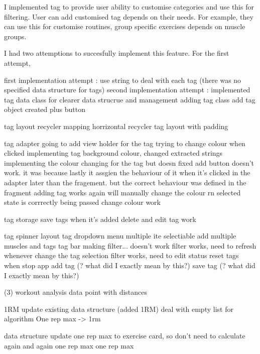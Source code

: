 
I implemented tag to provide user ability to customise categories and use this for filtering.
User can add customised tag depends on their needs.
For example, they can use this for customise routines, group specific exercises depends on muscle groups. 

I had two attemptions to succesfully implement this feature.
For the first attempt, 

first implementation attempt : use string to deal with each tag (there was no specified data structure for tags)
second implementation attempt : implemented tag data class for clearer data strucrue and management 
    adding tag class
    add tag object created
    plus button

\view
tag layout
recycler mapping
horrizontal recycler
tag layout with padding

\viewModel
tag adapter
going to add view holder for the tag
trying to change colour when clicked
implementing tag background colour, changed extracted strings
implementing the colour changing for the tag but doesn
fixed add button doesn't work. it was because lastly it assgien the behaviour of it when it's clicked in the adapter later than the fragement. but the correct behaviour was defined in the fragment
adding tag works again
will manually change the colour rn
selected state is corrrectly being passed
change colour work

\model
tag storage
save tags when it's added
delete and edit tag work

\addCardActivity
tag spinner layout 
tag dropdown menu
    multiple ite selectiable
    add multiple muscles and tags
\homeFragment\statusFragment
tag bar
    making filter... doesn't work
    filter works, need to refresh whenever change the tag selection
    filter works, need to edit status
    reset tags when stop app
    add tag (? what did I exactly mean by this?)
    save tag (? what did I exactly mean by this?)



(3) workout analysis 
\graph
data point with distances

\predicted 1RM
update existing data structure (added 1RM)
deal with empty list for algorithm
One rep max -> 1rm

data structure update
    \ExerciseCard
        one rep max to exercise card, so don't need to calculate again and again
    \ExerciseLog
        one rep max 
    \ExerciseSet
        one rep max

